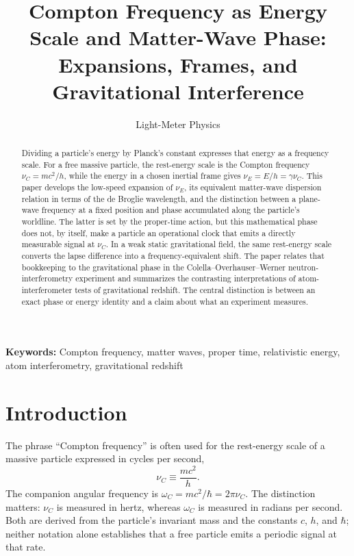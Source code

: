 \documentclass[12pt]{article}
\title{Compton Frequency as Energy Scale and Matter-Wave Phase:\\
Expansions, Frames, and Gravitational Interference}
\author{Light-Meter Physics}
\date{}
\begin{document}
\maketitle

\begin{abstract}
Dividing a particle's energy by Planck's constant expresses that energy as a frequency scale. For a free massive particle, the rest-energy scale is the Compton frequency $\nu_C=mc^2/h$, while the energy in a chosen inertial frame gives $\nu_E=E/h=\gamma\nu_C$. This paper develops the low-speed expansion of $\nu_E$, its equivalent matter-wave dispersion relation in terms of the de Broglie wavelength, and the distinction between a plane-wave frequency at a fixed position and phase accumulated along the particle's worldline. The latter is set by the proper-time action, but this mathematical phase does not, by itself, make a particle an operational clock that emits a directly measurable signal at $\nu_C$. In a weak static gravitational field, the same rest-energy scale converts the lapse difference into a frequency-equivalent shift. The paper relates that bookkeeping to the gravitational phase in the Colella--Overhauser--Werner neutron-interferometry experiment and summarizes the contrasting interpretations of atom-interferometer tests of gravitational redshift. The central distinction is between an exact phase or energy identity and a claim about what an experiment measures.
\end{abstract}

\noindent\textbf{Keywords:} Compton frequency, matter waves, proper time, relativistic energy, atom interferometry, gravitational redshift

\section{Introduction}

The phrase ``Compton frequency'' is often used for the rest-energy scale of a massive particle expressed in cycles per second,
\begin{equation}
  \nu_C\equiv\frac{mc^2}{h}.
  \label{eq:compton-frequency}
\end{equation}
The companion angular frequency is $\omega_C=mc^2/\hbar=2\pi\nu_C$. The distinction matters: $\nu_C$ is measured in hertz, whereas $\omega_C$ is measured in radians per second. Both are derived from the particle's invariant mass and the constants $c$, $h$, and $\hbar$; neither notation alone establishes that a free particle emits a periodic signal at that rate.
\end{document}
